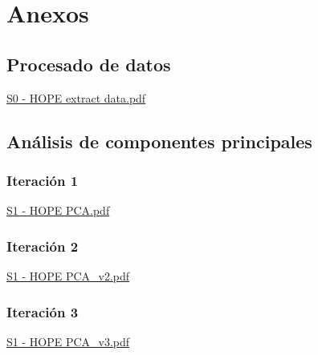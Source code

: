 \chapter{Anexos}
\label{chapter:anexos}


\section{Procesado de datos}
\label{anx01:procesado_datos}
\href{file://./anexos/S0 - HOPE extract data.pdf}{S0 - HOPE extract data.pdf}

\section{Análisis de componentes principales}
\label{anx02:pca}
\subsection{Iteración 1}
\label{anx02:pca1}
\href{file://./anexos/S1 - HOPE PCA.pdf}{S1 - HOPE PCA.pdf}

\subsection{Iteración 2}
\label{anx02:pca2}
\href{file://./anexos/S1 - HOPE PCA_v2.pdf}{S1 - HOPE PCA\_v2.pdf}

\subsection{Iteración 3}
\label{anx02:pca3}
\href{file://./anexos/S1 - HOPE PCA_v3.pdf}{S1 - HOPE PCA\_v3.pdf}
